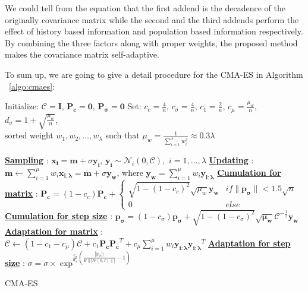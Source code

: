           We could tell from the equation that the first addend is the
          decadence of the originally covariance matrix while the second
          and the third addends perform the effect of history based
          information and population based information respectively. By
          combining the three factors along with proper weights, the
          proposed method makes the covariance matrix self-adaptive. 

          To sum up, we are going to give a detail procedure for the
          CMA-ES in Algorithm ~\ref{algo:cmaes}:

\begin{algorithm} \label{algo:cmaes}
  Initialize: $\mathcal{C} = \mathbf{I}$, $\mathbf{P_c} = \mathbf{0}$,
  $\mathbf{P_\sigma} = \mathbf{0}$\; Set: $c_c = \frac{4}{n}$, $c_\sigma
  = \frac{4}{n}$, $c_1 = \frac{2}{n}$, $c_\mu = \frac{\mu_w}{n}$,
  $d_\sigma = 1+\sqrt{\frac{\mu_w}{n}}$,\\sorted weight
  $w_1,w_2,\ldots,w_\lambda$ such that $\mu_w =
  \frac{1}{\sum\limits_{i=1}^\lambda w_i^2}\approx 0.3\lambda$ \;

   { \underline{\textbf{Sampling}} : $\mathbf{x_i}
  = \mathbf{m} + \sigma \mathbf{y_i}$, $\mathbf{y_i}
  \sim\mathcal{N}_i(0,\mathcal{C}),$ $i = 1,\ldots,\lambda$\;
  \underline{\textbf{Updating}} : $\mathbf{m} \leftarrow
  \sum\limits_{i=1}^\mu w_i \mathbf{x_{i:\lambda}} = \mathbf{m}+\sigma
  \mathbf{y_w}$, where $\mathbf{y_w} = \sum\limits_{i=1}^\mu w_i
  \mathbf{y_{i:\lambda}}$\; \underline{\textbf{Cumulation for matrix}}
  : $\mathbf{P_c} = (1-c_c)\mathbf{P_c}+\left\{ \begin{array}{cc}
    \sqrt{1-{\left(1-c_c\right)}^2}\sqrt{\mu_w}{\mathbf{y_w}} &
    if\|\mathbf{p_{\sigma}}\| < 1.5\sqrt{n}\\ 0 & else \end{array}
  \right.$\; \underline{\textbf{Cumulation for step size}} :
  $\mathbf{p_{\sigma}} =
  (1-c_{\sigma})\mathbf{p_{\sigma}}+\sqrt{1-{\left(
    1-c_{\sigma}\right)}^2}\sqrt{\mathbf{\mu_w}}\mathcal{C}^{-\frac{1}{2}}\mathbf{y_w}$\;
    \underline{\textbf{Adaptation for matrix}} : $\mathcal{C} \leftarrow
    (1-c_1-c_{\mu})\mathcal{C} + c_1{\mathbf{P_c}}{\mathbf{P_c}}^T +
    c_{\mu}\sum\limits_{i=1}^{\mu}
    w_i\mathbf{y_{i:\lambda}}\mathbf{y_{i:\lambda}}^T$\;
    \underline{\textbf{Adaptation for step size}} : $\sigma = \sigma
    \times \exp^{ \frac{c_{\sigma}}{d_{\sigma}} \left(\frac{\left||
      p_{\sigma} \right||}{ E\||{\mathcal{N}(0,I)}\||} -1 \right)  }$\;
    } \caption{CMA-ES} \end{algorithm}

